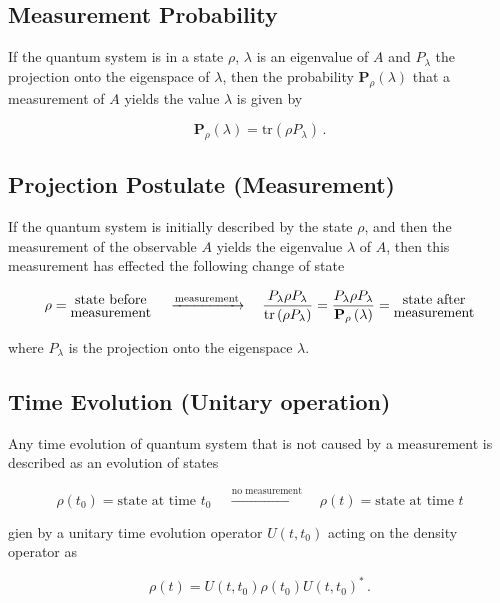 \documentclass[10pt,a4paper]{article}
\newcommand{\<}{\langle}
\renewcommand{\>}{\rangle}
\newcommand{\prths}[1]{\left( #1 \right)}
\newcommand{\tr}[1]{\textrm{tr} \left( #1 \right)}
\begin{document}
\subsection{Measurement Probability}
If the quantum system is in a state $\rho$, $\lambda$ is an eigenvalue of $A$
and $P_\lambda$ the projection onto the eigenspace of $\lambda$, then the
probability $\textbf{P}_\rho \prths{\lambda}$ that a measurement of $A$ yields
the value $\lambda$ is given by

$$
\textbf{P}_\rho \prths{\lambda} = \tr{\rho P_\lambda} \, .
$$

\subsection{Projection Postulate (Measurement)}
If the quantum system is initially described by the state $\rho$, and then the
measurement of the observable $A$ yields the eigenvalue $\lambda$ of $A$, then
this measurement has effected the following change of state

$$
\rho = \stackanchor{\textrm{state before}}{\textrm{measurement}}
\quad \, \xrightarrow{\textrm{measurement}} \quad
\frac{P_\lambda \rho P_\lambda}{\tr{\rho P_\lambda}}
= \frac{P_\lambda \rho P_\lambda}{\textbf{P}_\rho \prths{\lambda}}
= \stackanchor{\textrm{state after}}{\textrm{measurement}}
$$

where $P_\lambda$ is the projection onto the eigenspace $\lambda$.


\subsection{Time Evolution (Unitary operation)}
Any time evolution of quantum system that is not caused by a measurement is
described as an evolution of states

$$
\rho \prths{t_0} = \textrm{state at time } t_0
\quad \, \xrightarrow{\textrm{no measurement}} \quad
\rho \prths {t}
= \textrm{state at time } t
$$

gien by a unitary time evolution operator $U \prths{t, t_0}$ acting on the
density operator as

$$
\rho \prths{t} = U \prths{t, t_0} \rho \prths {t_0} U \prths{t, t_0}^* \, .
$$


\end{document}
